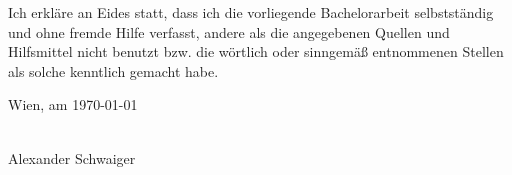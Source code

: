 \thispagestyle{empty}
\vspace*{2cm}

Ich erkläre an Eides statt, dass ich die vorliegende Bachelorarbeit selbstständig und ohne fremde Hilfe verfasst, andere als die angegebenen Quellen und Hilfsmittel nicht benutzt bzw. die wörtlich oder sinngemäß entnommenen Stellen als solche kenntlich gemacht habe.

\vspace*{3cm}

\noindent
Wien, am {\today} %
%
\hfill 
%
\begin{minipage}[t]{5cm}
	\centering
\underline{\hspace*{5cm}}\\
\small {Alexander Schwaiger}
\end{minipage}